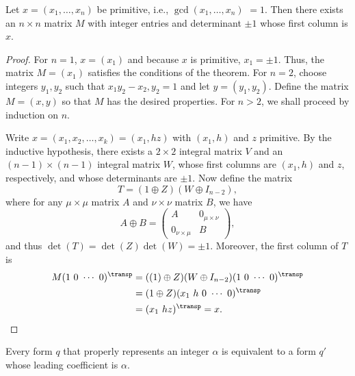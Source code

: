 \begin{theorem}{\normalfont\cite[p.~6]{watson1960integral}}
    Let \(x = (x_1, \dots, x_n)\) be primitive, i.e., \(\gcd(x_1, \dots, x_n)\) \(= 1\). Then there exists an \(n \times n\) matrix \(M\) with integer entries and determinant \(\pm 1\) whose first column is \(x\).
\end{theorem}

\begin{proof}
    For \(n = 1\), \(x = (x_1)\) and because \(x\) is primitive, \(x_1 = \pm 1\). Thus, the matrix \(M = (x_1)\) satisfies the conditions of the theorem. For \(n = 2\), choose integers \(y_1, y_2\) such that \(x_1y_2 - x_2, y_2 = 1\) and let \(y = (y_1, y_2)\). Define the matrix \(M = (x, y)\) so that \(M\) has the desired properties. For \(n > 2\), we shall proceed by induction on \(n\).
    
    Write \(x = (x_1, x_2, \dots, x_k) = (x_1, hz)\) with \((x_1, h)\) and \(z\) primitive. By the inductive hypothesis, there exists a \(2 \times 2\) integral matrix \(V\) and an \((n - 1) \times (n - 1)\) integral matrix \(W\), whose first columns are \((x_1, h)\) and \(z\), respectively, and whose determinants are \(\pm 1\). Now define the matrix
    \[
      T = (1 \oplus Z)(W \oplus I_{n - 2}),
    \]
    where for any \(\mu \times \mu\) matrix \(A\) and \(\nu \times \nu\) matrix \(B\), we have
    \[
      A \oplus B = \begin{pmatrix}
        A & 0_{\mu \times \nu} \\
        0_{\nu \times \mu} & B
      \end{pmatrix},
    \]
    and thus \(\det(T) = \det(Z)\det(W) = \pm 1\). Moreover, the first column of \(T\) is
    \begin{align*}
      M(1\ 0\ \cdots\ 0)^{\transp} &= ((1) \oplus Z)(W \oplus I_{n - 2})(1\ 0\ \cdots\ 0)^{\transp}\\
      &= (1 \oplus Z)(x_1\ h\ 0\ \cdots\ 0)^{\transp}\\
      &= (x_1\ hz)^{\transp} = x.
    \end{align*}
\end{proof}

\begin{corollary}{\normalfont\cite[p.~6]{watson1960integral}}
  \label{cor:leading-coefficient}
    Every form \(q\) that properly represents an integer \(\alpha\) is equivalent to a form \(q'\) whose leading coefficient is \(\alpha\).
\end{corollary}

